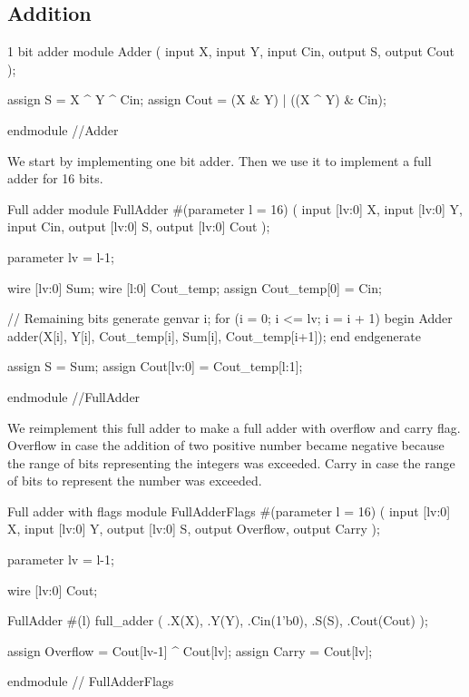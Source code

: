 \subsection{Addition}
\begin{code}{1 bit adder}
module Adder (
	input X,
	input Y,
	input Cin,
	output S,
	output Cout
);

assign S = X ^ Y ^ Cin;
assign Cout = (X & Y) | ((X ^ Y) & Cin);

endmodule //Adder
\end{code}
We start by implementing one bit adder. Then we use it to implement a full adder for 16 bits.
\begin{code}[14]{Full adder }
module FullAdder #(parameter l = 16) (
	input [lv:0] X,
	input [lv:0] Y,
	input Cin,
	output [lv:0] S,
	output [lv:0] Cout
);

parameter lv = l-1;

wire [lv:0] Sum;
wire [l:0] Cout_temp;
assign Cout_temp[0] = Cin;

// Remaining bits
generate genvar i;
	for (i = 0; i <= lv; i = i + 1) begin
		Adder adder(X[i], Y[i], Cout_temp[i], Sum[i], Cout_temp[i+1]);
	end
endgenerate

assign S = Sum;
assign Cout[lv:0] = Cout_temp[l:1];

endmodule //FullAdder
\end{code}
We reimplement this full adder to make a full adder with overflow and carry flag. Overflow in case the addition of two positive number became negative because the range of bits representing the integers was exceeded. Carry in case the range of bits to represent the number was exceeded.
\begin{code}[49]{Full adder with flags}
module FullAdderFlags #(parameter l = 16) (
	input [lv:0] X,
	input [lv:0] Y,
	output [lv:0] S,
	output Overflow,
	output Carry
);

parameter lv = l-1;

wire [lv:0] Cout;

FullAdder #(l) full_adder (
	.X(X), .Y(Y), .Cin(1'b0),
	.S(S), .Cout(Cout)
);

assign Overflow = Cout[lv-1] ^ Cout[lv];
assign Carry = Cout[lv];

endmodule // FullAdderFlags
\end{code}
